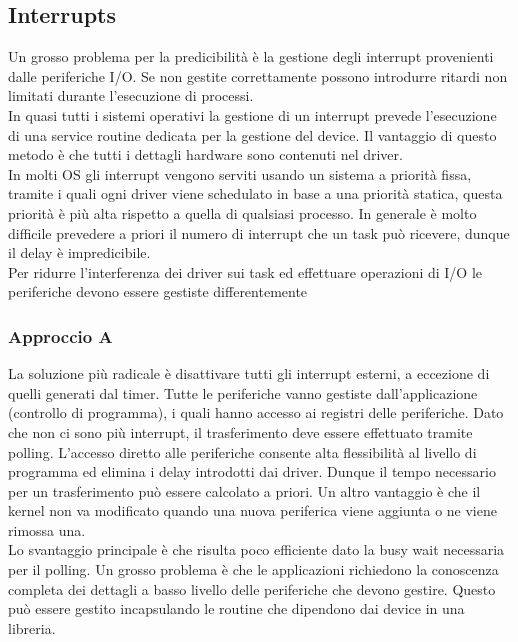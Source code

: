 \documentclass[12pt]{article}
\begin{document}
\subsection{Interrupts}
Un grosso problema per la predicibilità è la gestione degli interrupt provenienti dalle periferiche I/O.
Se non gestite correttamente possono introdurre ritardi non limitati durante l'esecuzione di processi.\\
In quasi tutti i sistemi operativi la gestione di un interrupt prevede l'esecuzione di una service routine dedicata per la gestione del device.
Il vantaggio di questo metodo è che tutti i dettagli hardware sono contenuti nel driver.\\
In molti OS gli interrupt vengono serviti usando un sistema a priorità fissa, tramite i quali ogni driver viene schedulato in base a una priorità statica, questa priorità è più alta rispetto a quella di qualsiasi processo.
In generale è molto difficile prevedere a priori il numero di interrupt che un task può ricevere, dunque il delay è impredicibile.
\\
Per ridurre l'interferenza dei driver sui task ed effettuare operazioni di I/O le periferiche devono essere gestiste differentemente
\subsubsection{Approccio A}
La soluzione più radicale è disattivare tutti gli interrupt esterni, a eccezione di quelli generati dal timer.
Tutte le periferiche vanno gestiste dall'applicazione (controllo di programma), i quali hanno accesso ai registri delle periferiche.
Dato che non ci sono più interrupt, il trasferimento deve essere effettuato tramite polling.
L'accesso diretto alle periferiche consente alta flessibilità al livello di programma ed elimina i delay introdotti dai driver.
Dunque il tempo necessario per un trasferimento può essere calcolato a priori.
Un altro vantaggio è che il kernel non va modificato quando una nuova periferica viene aggiunta o ne viene rimossa una.
\\
Lo svantaggio principale è che risulta poco efficiente dato la busy wait necessaria per il polling.
Un grosso problema è che le applicazioni richiedono la conoscenza completa dei dettagli a basso livello delle periferiche che devono gestire.
Questo può essere gestito incapsulando le routine che dipendono dai device in una libreria.
\end{document}
